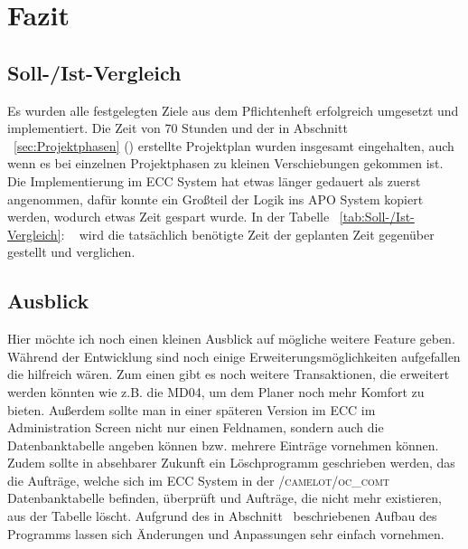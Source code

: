 \section{Fazit} 
\label{sec:Fazit}

\subsection{Soll-/Ist-Vergleich}
\label{sec:SollIstVergleich}

Es wurden alle festgelegten Ziele aus dem Pflichtenheft erfolgreich umgesetzt und implementiert. Die Zeit von 70 Stunden und der in Abschnitt ~\ref{sec:Projektphasen} () erstellte Projektplan wurden insgesamt eingehalten, auch wenn es bei einzelnen Projektphasen zu kleinen Verschiebungen gekommen ist. Die Implementierung im \ac{ECC} System hat etwas länger gedauert als zuerst angenommen, dafür konnte ein Großteil der Logik ins \ac{APO} System kopiert werden, wodurch etwas Zeit gespart wurde. In der Tabelle ~\ref{tab:Soll-/Ist-Vergleich}: ~ wird die tatsächlich benötigte Zeit der geplanten Zeit gegenüber gestellt und verglichen.

\subsection{Ausblick}
\label{sec:Ausblick}
Hier möchte ich noch einen kleinen Ausblick auf mögliche weitere Feature geben. Während der Entwicklung sind noch einige Erweiterungsmöglichkeiten aufgefallen die hilfreich wären. Zum einen gibt es noch weitere Transaktionen, die erweitert werden könnten wie z.B. die MD04, um dem Planer noch mehr Komfort zu bieten. Außerdem sollte man in einer späteren Version im \ac{ECC} im Administration Screen nicht nur einen Feldnamen, sondern auch die Datenbanktabelle angeben können bzw. mehrere Einträge vornehmen können. Zudem sollte in absehbarer Zukunft ein Löschprogramm geschrieben werden, das die Aufträge, welche sich im ECC System in der \textsc{/camelot/oc\_comt} Datenbanktabelle befinden, überprüft und Aufträge, die nicht mehr existieren, aus der Tabelle löscht. Aufgrund des in Abschnitt~ beschriebenen Aufbau des Programms lassen sich Änderungen und Anpassungen sehr einfach vornehmen. 
